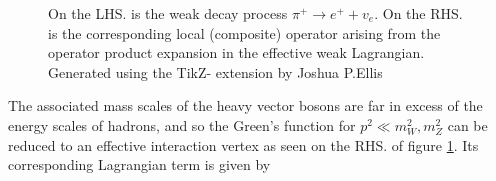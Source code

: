 \documentclass[a4paper,10pt]{book}
\begin{document}
\begin{figure}
\centering
{}
\quad
{}
\caption[The operator product expansion in the effective weak Lagrangian]{On the LHS. is the weak decay process $\pi^{+} \rightarrow e^{+}+v_{e}$. On the RHS. is the corresponding local (composite) operator arising from the operator product expansion in the effective weak Lagrangian. Generated using the TikZ- extension by Joshua P.Ellis \cite{ELLIS2017103}}
\label{fig:feynman_weak_decay}
\end{figure}
The associated mass scales of the heavy vector bosons are far in excess of the energy scales of hadrons, and so the Green's function for $p^2 \ll m_W^2, m_Z^2$ can be reduced to an effective interaction vertex as seen on the RHS. of figure \ref{fig:feynman_weak_decay}. Its corresponding Lagrangian term is given by
\end{document}
